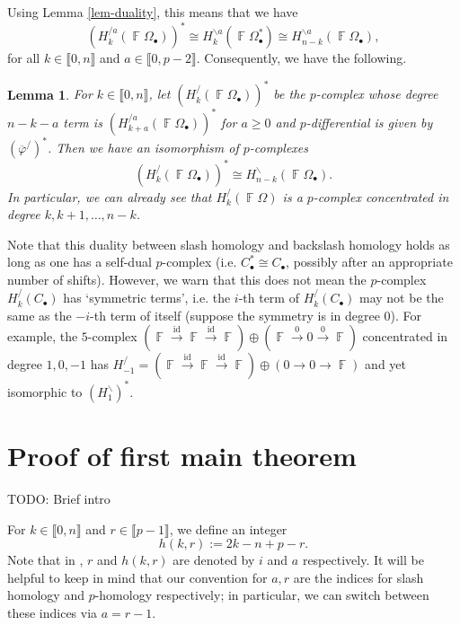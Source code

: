 \documentclass[a4paper]{amsart}
\numberwithin{equation}{subsection}
\newtheorem{lemma}[theorem]{Lemma}
\theoremstyle{definition}
\DeclareMathOperator{\F}{\mathbb{F}}
\newcommand{\interval}[1]{\llbracket #1 \rrbracket}
\newcommand{\comm}[1]{{\color{red}#1}}
\numberwithin{equation}{subsection}
\begin{document}
Using Lemma \ref{lem-duality}, this means that we have
\begin{equation}\label{eq:slash-dual}
(H_k^{/a}(\F\Omega_\bullet))^* \cong H_k^{\backslash a}(\F\Omega_\bullet^*) \cong  H_{n-k}^{\backslash a}(\F\Omega_\bullet), %
\end{equation}
for all $k\in\interval{0,n}$ and $a\in\interval{0,p-2}$.  Consequently, we have the following.

\begin{lemma}\label{lem:dual-p-cpx}
For $k\in\interval{0,n}$, let $(H_k^{\slash}(\F\Omega_\bullet))^*$ be the $p$-complex whose degree $n-k-a$ term is $(H_{k+a}^{\slash a}(\F\Omega_\bullet))^*$ for $a\geq 0$ and $p$-differential is given by $(\overline{\varphi}^{\slash})^*$.
Then we have an isomorphism of $p$-complexes 
\[
(H_k^{\slash}(\F\Omega_\bullet))^* \cong H_{n-k}^{\backslash}(\F\Omega_\bullet).
\]
In particular, we can already see that $H_k^{\slash}(\F\Omega)$ is a $p$-complex concentrated in degree $k, k+1, \ldots, n-k$.
\end{lemma}

Note that this duality between slash homology and backslash homology holds as long as one has a self-dual $p$-complex (i.e. $C_\bullet^*\cong C_\bullet$, possibly after an appropriate number of shifts).  However, we warn that this does not mean the $p$-complex $H_k^{/}(C_\bullet)$ has `symmetric terms', i.e. the $i$-th term of $H_k^{/}(C_\bullet)$ may not be the same as the $-i$-th term of itself (suppose the symmetry is in degree 0).  For example, the $5$-complex $(\F\xrightarrow{\mathrm{id}} \F\xrightarrow{\mathrm{id}} \F)\oplus (\F\xrightarrow{0}0\xrightarrow{0}\F)$ concentrated in degree $1, 0, -1$ has $H_{-1}^{\slash} = (\F\xrightarrow{\mathrm{id}} \F\xrightarrow{\mathrm{id}} \F) \oplus (0\to 0\to \F)$ and yet isomorphic to $(H_{1}^{\backslash})^*$.

\section{Proof of first main theorem}

\comm{TODO: Brief intro}

For $k\in\interval{0,n}$ and $r\in\interval{p-1}$, we define an integer
\[
 h(k,r) := 2k-n+p-r.
\]
Note that in \cite{BJS}, $r$ and $h(k,r)$ are denoted by $i$ and $a$ respectively.  It will be helpful to keep in mind that our convention for $a,r$ are the indices for slash homology and $p$-homology respectively; in particular, we can switch between these indices via $a=r-1$.
\end{document}
